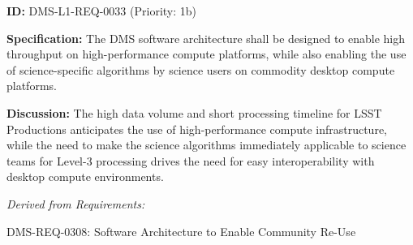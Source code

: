 \documentclass[SE,toc,lsstdraft]{lsstdoc}
\newcommand{\addendum}{}
\begin{document}
\label{DMS-L1-REQ-0033}
\textbf{ID:} DMS-L1-REQ-0033 (Priority: 1b)

\textbf{Specification:} The DMS software architecture shall be designed to enable high throughput on high-performance compute platforms, while also enabling the use of science-specific algorithms by science users on commodity desktop compute platforms.

\textbf{Discussion: }The high data volume and short processing timeline for LSST Productions anticipates the use of high-performance compute infrastructure, while the need to make the science algorithms immediately applicable to science teams for Level-3 processing drives the need for easy interoperability with desktop compute environments.

\emph{Derived from Requirements:}

DMS-REQ-0308:
Software Architecture to Enable Community Re-Use \newline

\addendum


\end{document}
